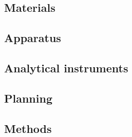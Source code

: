 \subsection{Materials}

\subsection{Apparatus}

\subsection{Analytical instruments}

\subsection{Planning}

\subsection{Methods}